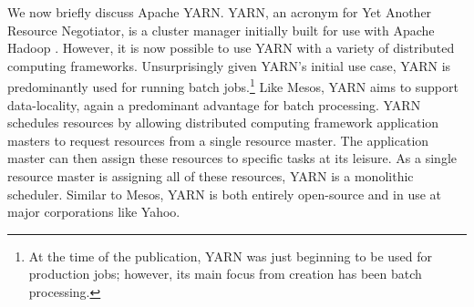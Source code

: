 We now briefly discuss Apache YARN. YARN, an acronym for Yet Another
Resource Negotiator, is a cluster manager initially built for use with Apache
Hadoop \cite{yarn}. However, it is now possible to use YARN with a variety
of distributed computing frameworks. Unsurprisingly given YARN's initial use
case, YARN is predominantly used for running batch jobs.\footnote{At the time of
the publication, YARN was just beginning to be used for production jobs;
however, its main focus from creation has been batch processing.}
Like Mesos, YARN aims to support data-locality,
again a predominant advantage for batch processing. YARN
schedules resources by allowing distributed computing framework application
masters to request resources from a single resource master.
The application master can then assign these resources to specific tasks at its
leisure. As a single resource master is assigning all of these resources, YARN is a
monolithic scheduler. Similar to Mesos, YARN is both entirely open-source and in use
at major corporations like Yahoo.

